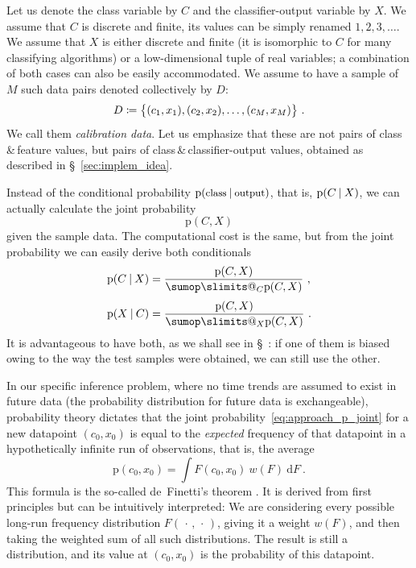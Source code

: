 \documentclass[\ifafour a4paper,12pt,\else a5paper,10pt,\fi%
onecolumn,oneside,article,%
british%
]{memoir}
\makeatletter
\theoremstyle{remark}
\theoremstyle{innote}
\def\sum{\DOTSI\sumop\slimits@}
\newcommand*{\amp}{\&}
\newcommand*{\wrench}{{\fontencoding{U}\fontfamily{fontawesomethree}\selectfont\symbol{114}}}
\newcommand*{\pencil}{{\fontencoding{U}\fontfamily{fontawesometwo}\selectfont\symbol{210}}}
\newcommand{\mynotew}[1]{{\footnotesize\color{notecolour}\wrench\ #1}}
\newcommand*{\di}{\mathrm{d}}%
\newcommand*{\defd}{\coloneqq}
\newcommand*{\dotv}{\mathord{\,\cdot\,}}%
\DeclarePairedDelimiter\set{\{}{\}} %
\newcommand*{\p}{\mathrm{p}}%
\renewcommand*{\|}[1][]{\nonscript\:#1\vert\nonscript\:\mathopen{}}
\newcommand*{\sect}{\S}%
\newcommand*{\chap}{ch.}%
\newcommand*{\wf}{w}
\newcommand*{\texts}[1]{\text{\small #1}}
\makeatother
\begin{document}
Let us denote the class variable by $C$ and the classifier-output variable by $X$. We assume that $C$ is discrete and finite, its values can be simply renamed $1,2,3,\dotsc$. We assume that $X$ is either discrete and finite (it is isomorphic to $C$ for many classifying algorithms) or a low-dimensional tuple of real variables; a combination of both cases can also be easily accommodated. We assume to have a sample of $M$ such data pairs denoted collectively by $D$:
\begin{equation}
  \label{eq:sample_data_notation}
  D \defd \set[\big]{(c_{1}, x_{1}), (c_{2}, x_{2}), \dotsc, (c_{M}, x_{M}) } \ .
\end{equation}
We call them \emph{calibration data}. Let us emphasize that these are not pairs of class\,\amp\,feature values, but pairs of class\,\amp\,classifier-output values, obtained as described in \sect~\ref{sec:implem_idea}.

Instead of the conditional probability $\p(\texts{class} \| \texts{output})$, that is, $\p(C \| X)$,  we can actually calculate the joint probability
\begin{equation}
  \label{eq:approach_p_joint}
  \p(C, X)
\end{equation}
given the sample data. The computational cost is the same, but from the joint probability we can easily derive both conditionals
\begin{align}
  \label{eq:approach_p_conditional_direct}
  \p(C \| X) &= \frac{\p(C, X)}{ \sum_{C} \p(C, X) } \ ,
  \\[\jot]
  \label{eq:approach_p_conditional_inverse}
  \p(X \| C) &= \frac{\p(C, X)}{ \sum_{X} \p(C, X) } \ .
\end{align}
It is advantageous to have both, as we shall see in \sect\mynotew{\pencil}: if one of them is biased owing to the way the test samples were obtained, we can still use the other.

In our specific inference problem, where no time trends are assumed to exist in future data (the probability distribution for future data is exchangeable), probability theory dictates that the joint probability~\eqref{eq:approach_p_joint} for a new datapoint $(c_{0}, x_{0})$ is equal to the \emph{expected} frequency of that datapoint  in a hypothetically infinite run of observations, that is, the average
\begin{equation}
  \label{eq:prob_is_expe_freq}
  \p(c_{0}, x_{0}) = \int\! F(c_{0}, x_{0})\ \wf(F)\ \di F \ .
\end{equation}
This formula is the so-called de~Finetti's theorem \autocites[\chap~4]{bernardoetal1994_r2000}{dawid2013,definetti1929,definetti1937}. It is derived from first principles but can be intuitively interpreted: We are considering every possible long-run frequency distribution $F(\dotv, \dotv)$, giving it a weight $\wf(F)$, and then taking the weighted sum of all such distributions. The result is still a distribution, and its value at $(c_{0}, x_{0})$ is the probability of this datapoint.
\end{document}
